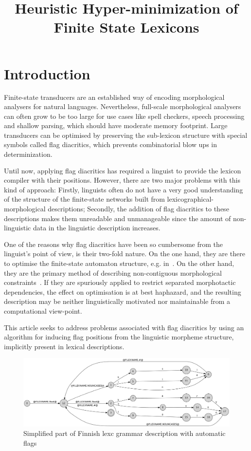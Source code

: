 \documentclass[10pt, a4paper]{article}
\title{Heuristic Hyper-minimization of Finite State Lexicons}
\begin{document}
\maketitleabstract


\section{Introduction}

Finite-state transducers are an established way of encoding
morphological analysers for natural languages. Nevertheless,
full-scale morphological analysers can often grow to be too large for
use cases like spell checkers, speech processing and shallow parsing, which 
should have moderate memory footprint. Large transducers can be optimised by preserving the sub-lexicon structure with special symbols called flag diacritics, which prevents combinatorial blow ups in determinization.


Until now, applying flag diacritics has required a linguist to provide
the lexicon compiler with their positions. However, there are two
major problems with this kind of approach: Firstly, linguists often do
not have a very good understanding of the structure of the
finite-state networks built from lexicographical-morphological
descriptions; Secondly, the addition of flag diacritics to these
descriptions makes them unreadable and unmanageable since the amount
of non-linguistic data in the linguistic description increases. 

One of the reasons why flag diacritics have been so cumbersome from
the linguist's point of view, is their two-fold nature. On the one hand,
they are there to optimise the finite-state automaton structure,
e.g. in~\cite{karttunen2006numbers}. On the other hand, they are the
primary method of describing non-contiguous morphological
constraints~\cite{beesley1998constraining}. If they are spuriously applied to restrict 
separated morphotactic dependencies, the effect on
optimisation is at best haphazard, and the resulting description may be
neither linguistically motivated nor maintainable from a computational
view-point.

This article seeks to address problems associated with flag diacritics
by using an algorithm for inducing flag positions from the linguistic
morpheme structure, implicitly present in lexical
descriptions.

\begin{figure}
    \includegraphics[width=\textwidth]{transducer.png}
     \caption{Simplified part of Finnish lexc grammar description with automatic flags
     \label{fig:lexc-fin-flag}}
\end{figure}
\end{document}
